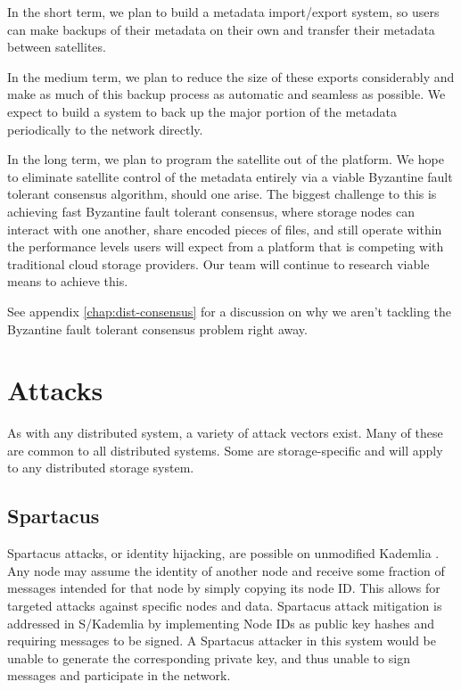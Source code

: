 \documentclass[11pt,fleqn,openany]{book}
\begin{document}
In the short term, we plan to build a metadata import/export system, so users
can make backups of their metadata on their own and transfer their metadata
between satellites.

In the medium term, we plan to reduce the size of these exports considerably
and make as much of this backup process as automatic and seamless as possible.
We expect to build a system to back up the major portion of the metadata
periodically to the network directly.

In the long term, we plan to program the satellite out of the platform.
We hope to eliminate satellite control of the metadata
entirely via a viable Byzantine fault tolerant consensus algorithm, should
one arise.
The biggest challenge to this is achieving fast Byzantine fault tolerant
consensus, where storage nodes can interact with one another, share encoded
pieces of files, and still operate within the performance levels users will
expect from a platform that is competing with traditional cloud storage
providers. Our team will continue to research viable means to achieve this.

See appendix \ref{chap:dist-consensus} for a discussion on why
we aren't tackling the Byzantine fault tolerant consensus problem right away.

\newpage \appendix

\chapter{Attacks}

As with any distributed system, a variety of attack vectors exist. Many of these
are common to all distributed systems. Some are storage-specific and will apply
to any distributed storage system.

\section{Spartacus}

Spartacus attacks, or identity hijacking, are possible on unmodified Kademlia
\cite{kad}.
Any node may assume the identity of another node and receive some fraction of
messages intended for that node by simply copying its node ID.
This allows for targeted attacks against specific nodes and data.
Spartacus attack mitigation is addressed in S/Kademlia \cite{skad} by
implementing Node IDs as public key hashes and requiring messages to be signed.
A Spartacus attacker in this system would be unable to generate the
corresponding private key, and thus unable to sign messages and participate in
the network.
\end{document}
